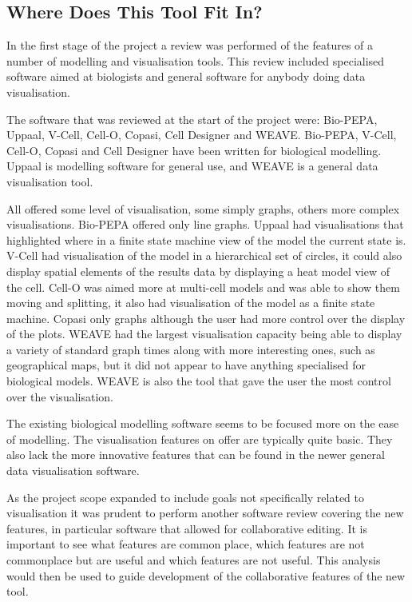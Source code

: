 \subsection{Where Does This Tool Fit In?}

In the first stage of the project a review was performed of the features of a number of modelling and visualisation tools.  This review included specialised software aimed at biologists and general software for anybody doing data visualisation.

The software that was reviewed at the start of the project were: Bio-PEPA, Uppaal, V-Cell, Cell-O, Copasi, Cell Designer and WEAVE.  Bio-PEPA, V-Cell, Cell-O, Copasi and Cell Designer have been written for biological modelling.  Uppaal is modelling software for general use, and WEAVE is a general data visualisation tool.

All offered some level of visualisation, some simply graphs, others more complex visualisations.  Bio-PEPA offered only line graphs.  Uppaal had visualisations that highlighted where in a finite state machine view of the model the current state is.  V-Cell had visualisation of the model in a hierarchical set of circles, it could also display spatial elements of the results data by displaying a heat model view of the cell.  Cell-O was aimed more at multi-cell models and was able to show them moving and splitting, it also had visualisation of the model as a finite state machine.  Copasi only graphs although the user had more control over the display of the plots.  WEAVE had the largest visualisation capacity being able to display a variety of standard graph times along with more interesting ones, such as geographical maps, but it did not appear to have anything specialised for biological models.  WEAVE is also the tool that gave the user the most control over the visualisation.

The existing biological modelling software seems to be focused more on the ease of modelling.  The visualisation features on offer are typically quite basic.  They also lack the more innovative features that can be found in the newer general data visualisation software.

As the project scope expanded to include goals not specifically related to visualisation it was prudent to perform another software review covering the new features, in particular software that allowed for collaborative editing.  It is important to see what features are common place, which features are not commonplace but are useful and which features are not useful. This analysis would then be used to guide development of the collaborative features of the new tool.

